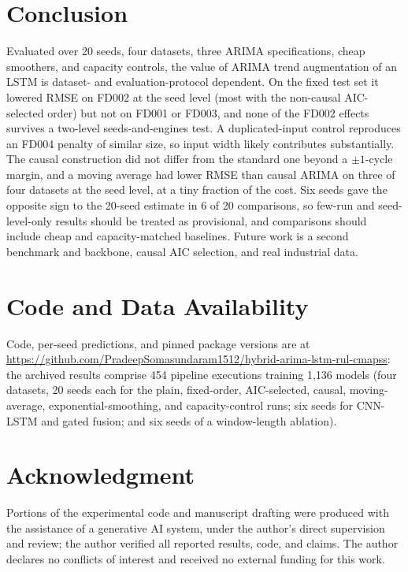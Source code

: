 \documentclass[conference]{IEEEtran}
\newif\ifblind\blindfalse
\begin{document}
\section{Conclusion}
Evaluated over 20 seeds, four datasets, three ARIMA specifications, cheap smoothers, and capacity controls, the value of ARIMA trend augmentation of an LSTM is dataset- and evaluation-protocol dependent. On the fixed test set it lowered RMSE on FD002 at the seed level (most with the non-causal AIC-selected order) but not on FD001 or FD003, and none of the FD002 effects survives a two-level seeds-and-engines test. A duplicated-input control reproduces an FD004 penalty of similar size, so input width likely contributes substantially. The causal construction did not differ from the standard one beyond a $\pm1$-cycle margin, and a moving average had lower RMSE than causal ARIMA on three of four datasets at the seed level, at a tiny fraction of the cost. Six seeds gave the opposite sign to the 20-seed estimate in 6 of 20 comparisons, so few-run and seed-level-only results should be treated as provisional, and comparisons should include cheap and capacity-matched baselines. Future work is a second benchmark and backbone, causal AIC selection, and real industrial data.

\section*{Code and Data Availability}
Code, per-seed predictions, and pinned package versions are at \ifblind [repository URL withheld for blind review]\else\url{https://github.com/PradeepSomasundaram1512/hybrid-arima-lstm-rul-cmapss}\fi: the archived results comprise 454 pipeline executions training 1{,}136 models (four datasets, 20 seeds each for the plain, fixed-order, AIC-selected, causal, moving-average, exponential-smoothing, and capacity-control runs; six seeds for CNN-LSTM and gated fusion; and six seeds of a window-length ablation).

\section*{Acknowledgment}
Portions of the experimental code and manuscript drafting were produced with the assistance of a generative AI system, under the author's direct supervision and review; the author verified all reported results, code, and claims. The author declares no conflicts of interest and received no external funding for this work.
\end{document}
